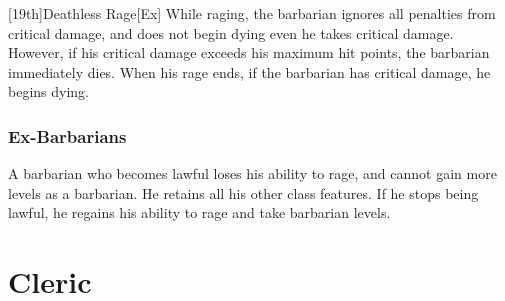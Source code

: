 [19th]{Deathless Rage}[Ex]
While raging, the barbarian ignores all penalties from critical damage, and does not begin dying even he takes critical damage.
However, if his critical damage exceeds his maximum hit points, the barbarian immediately dies.
When his rage ends, if the barbarian has critical damage, he begins dying.

\subsubsection{Ex-Barbarians}
A barbarian who becomes lawful loses his ability to rage, and cannot gain more levels as a barbarian.
He retains all his other class features.
If he stops being lawful, he regains his ability to rage and take barbarian levels.

\section{Cleric}
